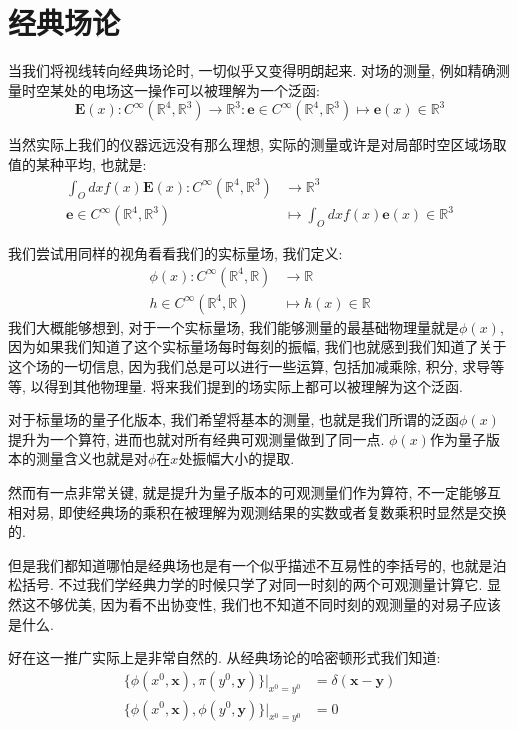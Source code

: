 \section{经典场论}
当我们将视线转向经典场论时, 一切似乎又变得明朗起来. 对场的测量, 例如精确测量时空某处的电场这一操作可以被理解为一个泛函:
\begin{equation*}
    \mathbf{E}(x): C^\infty(\mathbb{R}^4, \mathbb{R}^3)\rightarrow\mathbb{R}^3:\mathbf{e}\in C^\infty(\mathbb{R}^4, \mathbb{R}^3)\mapsto \mathbf{e}(x)\in\mathbb{R}^3
\end{equation*}\par
当然实际上我们的仪器远远没有那么理想, 实际的测量或许是对局部时空区域场取值的某种平均, 也就是:
\begin{align*}
    \int_Odxf(x)\mathbf{E}(x): C^\infty(\mathbb{R}^4, \mathbb{R}^3)&\rightarrow\mathbb{R}^3\\
    \mathbf{e}\in C^\infty(\mathbb{R}^4, \mathbb{R}^3)&\mapsto \int_Odxf(x)\mathbf{e}(x)\in\mathbb{R}^3
\end{align*}\par
我们尝试用同样的视角看看我们的实标量场, 我们定义:
\begin{align}
    \phi(x): C^\infty(\mathbb{R}^4, \mathbb{R})&\rightarrow\mathbb{R}\\
    h\in C^\infty(\mathbb{R}^4, \mathbb{R})&\mapsto h(x)\in\mathbb{R}
\end{align}
我们大概能够想到, 对于一个实标量场, 我们能够测量的最基础物理量就是$\phi(x)$, 因为如果我们知道了这个实标量场每时每刻的振幅, 我们也就感到我们知道了关于这个场的一切信息, 因为我们总是可以进行一些运算, 包括加减乘除, 积分, 求导等等, 以得到其他物理量. 将来我们提到的场实际上都可以被理解为这个泛函.\par
对于标量场的量子化版本, 我们希望将基本的测量, 也就是我们所谓的泛函$\phi(x)$提升为一个算符, 进而也就对所有经典可观测量做到了同一点. $\phi(x)$作为量子版本的测量含义也就是对$\phi$在$x$处振幅大小的提取.\par
然而有一点非常关键, 就是提升为量子版本的可观测量们作为算符, 不一定能够互相对易, 即使经典场的乘积在被理解为观测结果的实数或者复数乘积时显然是交换的.\par
但是我们都知道哪怕是经典场也是有一个似乎描述不互易性的李括号的, 也就是泊松括号. 不过我们学经典力学的时候只学了对同一时刻的两个可观测量计算它. 显然这不够优美, 因为看不出协变性, 我们也不知道不同时刻的观测量的对易子应该是什么.\par
好在这一推广实际上是非常自然的. 从经典场论的哈密顿形式我们知道:
\begin{align}
    \{\phi(x^0, \mathbf{x}), \pi(y^0, \mathbf{y})\}|_{x^0=y^0}&=\delta(\mathbf{x}-\mathbf{y})\\
    \{\phi(x^0, \mathbf{x}), \phi(y^0, \mathbf{y})\}|_{x^0=y^0}&=0
\end{align}

